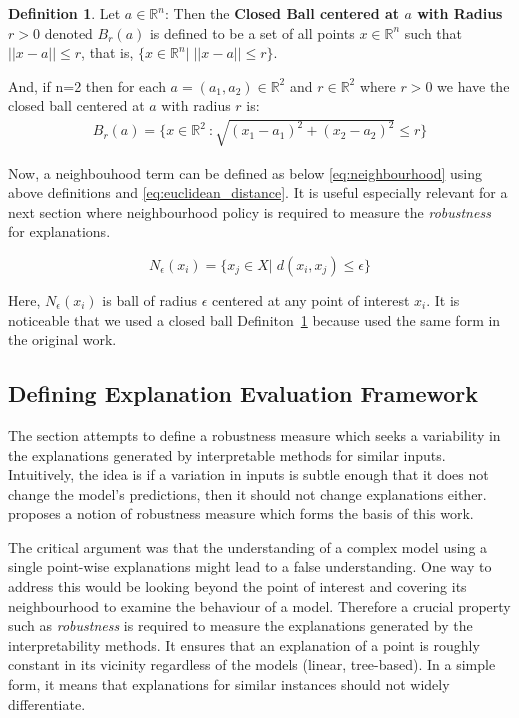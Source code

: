 \documentclass[english]{tktltiki2}
\theoremstyle{definition}
\newtheorem{definition}[thm]{Definition}
\theoremstyle{remark}
\newcommand{\onespace}{\;}
\begin{document}
\begin{definition}\label{def:2}{Let $a \in {\mathbb{R}}^n$: Then the \textbf{Closed Ball centered at $a$ with Radius $r > 0$} denoted $B_{r}(a)$ is defined to be a set of all points $x \in {\mathbb{R}}^n$ such that $||x-a|| \leq r$, that is, $\{x \in {\mathbb{R}}^n |\;||x - a|| \leq r\}.$}
\end{definition}
And, if n=2 then for each $a = (a_1,a_2) \in {\mathbb{R}}^2$ and $r \in {\mathbb{R}}^2$ where $r > 0$ we have the closed ball centered at $a$ with radius $r$ is:
\begin{align*}
B_{r}(a) = \{x \in {\mathbb{R}}^2\ : \sqrt{(x_1 - a_1)^2 + (x_2 - a_2)^2} \leq r\}
\end{align*}

Now, a neighbouhood term can be defined as below \eqref{eq:neighbourhood} using above definitions and \eqref{eq:euclidean_distance}. It is useful especially relevant for a next section where neighbourhood policy is required to measure the \textit{robustness} for explanations. 

\begin{equation}\label{eq:neighbourhood}
N_{\epsilon}(x_i) = \{x_j \in X| \onespace d(x_i, x_j) \leq \epsilon\}
\end{equation}  

Here, $N_{\epsilon}(x_{i})$ is ball of radius $\epsilon$ centered at any point of interest $x_i$. It is noticeable that we used a closed ball Definiton~\ref{def:2} because \citep{alvarez2018robustness} used the same form in the original work.

\subsection{Defining Explanation Evaluation Framework}\label{sec:defining_explanation_evaluation_framework} %
The section attempts to define a robustness measure which seeks a variability in the explanations generated by interpretable methods for similar inputs. Intuitively, the idea is if a variation in inputs is subtle enough that it does not change the model's predictions, then it should not change explanations either. \citet{alvarez2018robustness} proposes a notion of robustness measure which forms the basis of this work.

The critical argument was that the understanding of a complex model using a single point-wise explanations might lead to a false understanding. One way to address this would be looking beyond the point of interest and covering its neighbourhood to examine the behaviour of a model. Therefore a crucial property such as \textit{robustness} is required to measure the explanations generated by the interpretability methods. It ensures that an explanation of a point is roughly constant in its vicinity regardless of the models (linear, tree-based).  In a simple form, it means that explanations for similar instances should not widely differentiate.
\end{document}
